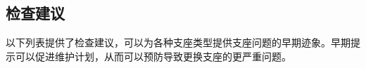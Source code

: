 \subsection{检查建议}
\label{subsec:recommendations-inspection}
以下列表提供了检查建议，可以为各种支座类型提供支座问题的早期迹象。早期提示可以促进维护计划，从而可以预防导致更换支座的更严重问题。

